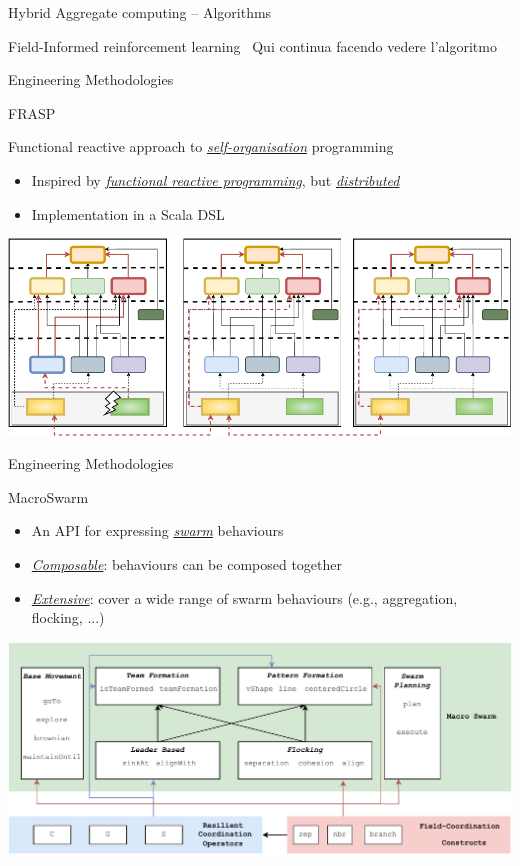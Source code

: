 \documentclass[presentation, 9pt]{beamer}\mode<presentation>{\usetheme{AMSBolognaFC}}
\begin{document}
\begin{frame}{Hybrid Aggregate computing -- Algorithms}
  
  \begin{exampleblock}{Field-Informed reinforcement learning~\cite{acgnn}}
    Qui continua facendo vedere l'algoritmo
  \end{exampleblock}
  \end{frame}
\begin{frame}{Engineering Methodologies}
\begin{exampleblock}{FRASP~\cite{frasp}}
  
  Functional reactive approach to \emph{\underline{self-organisation}} programming
\begin{itemize}
  \item Inspired by \emph{\underline{functional reactive programming}}, but \emph{\underline{distributed}}
  \item Implementation in a Scala DSL
\end{itemize}
\includegraphics[width=\textwidth]{img/interactions.pdf}
\end{exampleblock}
\end{frame}
\begin{frame}{Engineering Methodologies}
\begin{exampleblock}{MacroSwarm~\cite{macroswarm}}
  \begin{itemize}
    \item An API for expressing \underline{\emph{swarm}} behaviours
    \item \emph{\underline{Composable}}: behaviours can be composed together
    \item \emph{\underline{Extensive}}: cover a wide range of swarm behaviours (e.g., aggregation, flocking, ...)
  \end{itemize}
\includegraphics[width=\textwidth]{img/architecture-macro.drawio.pdf}
\end{exampleblock}
\end{frame}
\end{document}
